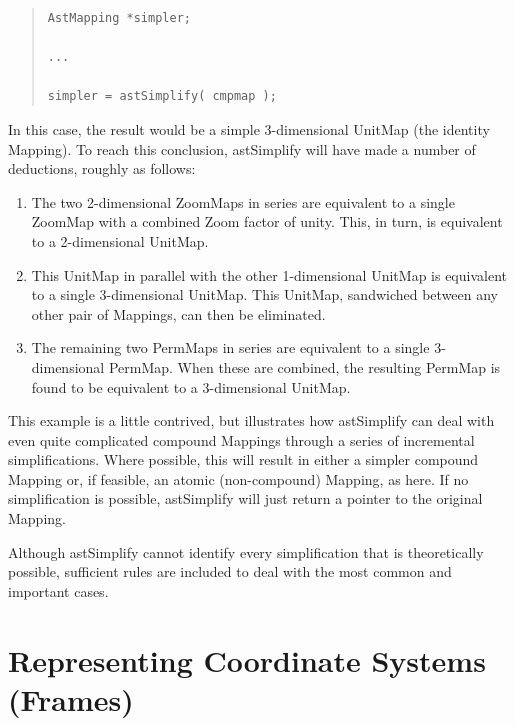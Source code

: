 \documentclass[twoside,11pt]{article}
\newcommand{\htmlref}[2]{#1}
\begin{document}
\begin{quote}
\small
\begin{verbatim}
AstMapping *simpler;

...

simpler = astSimplify( cmpmap );
\end{verbatim}
\normalsize
\end{quote}

In this case, the result would be a simple 3-dimensional UnitMap (the
identity Mapping).  To reach this conclusion, astSimplify will have
made a number of deductions, roughly as follows:

\begin{enumerate}
\item The two 2-dimensional ZoomMaps in series are equivalent to a
single \htmlref{ZoomMap}{ZoomMap} with a combined \htmlref{Zoom}{Zoom} factor of unity. This, in turn, is
equivalent to a 2-dimensional UnitMap.

\item This UnitMap in parallel with the other 1-dimensional UnitMap is
equivalent to a single 3-dimensional UnitMap. This UnitMap, sandwiched
between any other pair of Mappings, can then be eliminated.

\item The remaining two PermMaps in series are equivalent to a single
3-dimensional \htmlref{PermMap}{PermMap}. When these are combined, the resulting PermMap
is found to be equivalent to a 3-dimensional UnitMap.
\end{enumerate}

This example is a little contrived, but illustrates how astSimplify
can deal with even quite complicated compound Mappings through a
series of incremental simplifications. Where possible, this will
result in either a simpler compound Mapping or, if feasible, an atomic
(non-compound) Mapping, as here. If no simplification is possible,
astSimplify will just return a pointer to the original Mapping.

Although astSimplify cannot identify every simplification that is
theoretically possible, sufficient rules are included to deal with the
most common and important cases.

\cleardoublepage
%
\section{\label{ss:frames}Representing Coordinate Systems (Frames)}
\end{document}
